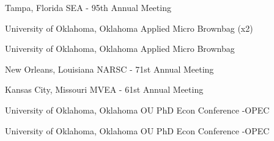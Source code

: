 {%
	Tampa, Florida}
{%
	SEA - 95th Annual Meeting}
{}

{%
	University of Oklahoma, Oklahoma}
{%
	Applied Micro Brownbag (x2)}
{}

{%
	University of Oklahoma, Oklahoma}
{%
	Applied Micro Brownbag}
{}

{%
	New Orleans, Louisiana}
{%
	NARSC - 71st Annual Meeting}
{}

{%
	Kansas City, Missouri}
{%
	MVEA - 61st Annual Meeting}
{}


{%
	University of Oklahoma, Oklahoma}
{%
	OU PhD Econ Conference -OPEC}
{}


{%
	University of Oklahoma, Oklahoma}
{%
	OU PhD Econ Conference -OPEC}
{}